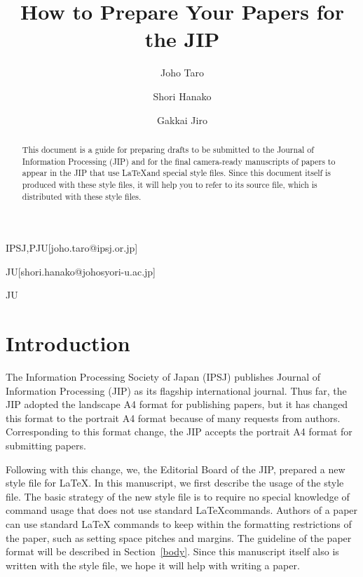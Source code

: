 \documentclass[techrep,english]{ipsj}
\begin{document}
\title{How to Prepare Your Papers for the JIP}


\author{Joho Taro}{IPSJ,PJU}[joho.taro@ipsj.or.jp]
\author{Shori Hanako}{JU}[shori.hanako@johosyori-u.ac.jp]
\author{Gakkai Jiro}{JU}

\begin{abstract}
This document is a guide for preparing drafts to be submitted to the
Journal of Information Processing (JIP) and for the final camera-ready
manuscripts of papers to appear in the JIP that use \LaTeX and special
style files.  Since this document itself is produced with these style
files, it will help you to refer to its source file, which is
distributed with these style files.
\end{abstract}


\maketitle

\section{Introduction}

The Information Processing Society of Japan (IPSJ) publishes Journal of
Information Processing (JIP) as its flagship international journal.
Thus far, the JIP adopted the landscape A4 format for publishing papers,
but it has changed this format to the portrait A4 format because of many
requests from authors.  Corresponding to this format change, the JIP
accepts the portrait A4 format for submitting papers.

Following with this change, we, the Editorial Board of the JIP, prepared
a new style file for \LaTeX\@.  In this manuscript, we first describe
the usage of the style file.  The basic strategy of the new style file
is to require no special knowledge of command usage that does not use
standard \LaTeX commands.  Authors of a paper can use standard \LaTeX
commands to keep within the formatting restrictions of the paper, such
as setting space pitches and margins.  The guideline of the paper format
will be described in Section~\ref{body}.  Since this manuscript itself
also is written with the style file, we hope it will help with writing a
paper.
\end{document}
